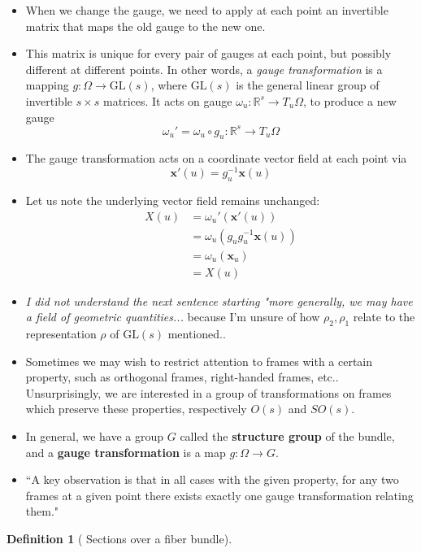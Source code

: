 \documentclass[12pt]{article}
\numberwithin{equation}{section}
\theoremstyle{definition}
\newtheorem{defn}[thm]{Definition}
\newcommand{		\R		}	{	\mathbb{R}				}
\newcommand{		\GL		}	{	\textrm{GL}				}
\newcommand{		\B		}	{\textbf					} %
\newcommand{		\Oh		}	{	\Omega					}
\newcommand{		\1		}	{	\bm{1}					}%
\begin{document}
\begin{itemize}
\item When we change the gauge, we need to apply at each point an invertible matrix that maps the old gauge to the new one. 
\item This matrix is unique for every pair of gauges at each point, but possibly different at different points. In other words, a \emph{gauge transformation} is a mapping $g : \Oh \to \GL(s)$, where $\GL(s)$ is the general linear group of invertible $s \times s$ matrices. It acts on gauge $\omega_u : \R^s \to T_u\Oh$, to produce a new gauge
$$
\omega_u ' = \omega_u \circ g_u : \mathbb{R}^s \to T_u \Oh
$$
\item The gauge transformation acts on a coordinate vector field at each point via 
$$
\mathbf{x}'(u) = g_u^{-1} \mathbf{x} (u) 
$$ 
\item Let us note the underlying vector field remains unchanged:
\begin{align*}
X(u) &= \omega_u' ( \mathbf{x}'(u)) \\
&= \omega_u( g_u g_u^{-1} \mathbf{x}(u)) \\
&= \omega_u( \mathbf{x}_u ) \\
&= X(u) 
\end{align*}

\item \emph{I did not understand the next sentence starting "more generally, we may have a field of geometric quantities...} because I'm unsure of how $\rho_2, \rho_1$ relate to the representation $\rho$ of $\GL(s)$ mentioned..

\item Sometimes we may wish to restrict attention to frames with a certain property, such as orthogonal frames, right-handed frames, etc.. Unsurprisingly, we are interested in a group of transformations on frames which preserve these properties, respectively $O(s)$ and $SO(s)$.

\item In general, we have a group $G$ called the \B{structure group} of the bundle, and a \B{gauge transformation} is a map $g : \Oh \to G$. 

\item ``A key observation is that in all cases with the given property, for any two frames at a given point there exists exactly one gauge transformation relating them."
\end{itemize}

\begin{defn}[ Sections over a fiber bundle]

\end{defn}
\end{document}
